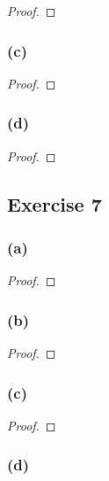 \documentclass[14pt]{extarticle}
\begin{document}
\begin{proof}

\end{proof}

\subsubsection{(c)}

\begin{proof}

\end{proof}

\subsubsection{(d)}

\begin{proof}

\end{proof}

\subsection{Exercise 7}

\subsubsection{(a)}

\begin{proof}

\end{proof}

\subsubsection{(b)}

\begin{proof}

\end{proof}

\subsubsection{(c)}

\begin{proof}

\end{proof}

\subsubsection{(d)}
\end{document}
